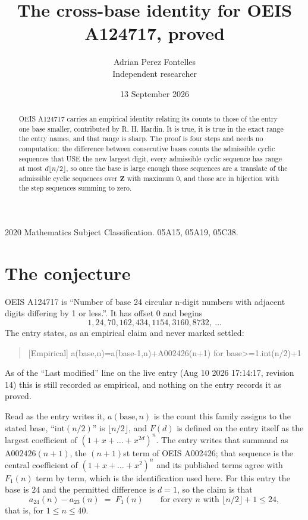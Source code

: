\documentclass[11pt,a4paper]{article}
\title{The cross-base identity for OEIS A124717, proved}
\author{Adrian Perez Fontelles\\ \small Independent researcher}
\date{13 September 2026}
\theoremstyle{plain}
\theoremstyle{definition}
\begin{document}
\maketitle

\begin{abstract}
OEIS A124717 carries an empirical identity relating its counts to those of the entry one base
smaller, contributed by R. H. Hardin. It is true, it is true in the exact range the entry
names, and that range is sharp. The proof is four steps and needs no computation: the
difference between consecutive bases counts the admissible cyclic sequences that USE the new
largest digit, every admissible cyclic sequence has range at most $d\lfloor n/2\rfloor$, so
once the base is large enough those sequences are a translate of the admissible cyclic
sequences over $\mathbf{Z}$ with maximum $0$, and those are in bijection with the step
sequences summing to zero.
\end{abstract}

\noindent\small 2020 Mathematics Subject Classification. 05A15, 05A19, 05C38.\normalsize

\section{The conjecture}

OEIS A124717 is ``Number of base 24 circular n-digit numbers with adjacent digits differing by 1 or less.''. It has offset $0$ and begins
\[
1, 24, 70, 162, 434, 1154, 3160, 8732,\ \dots
\]
The entry states, as an empirical claim and never marked settled:
\begin{quote}
[Empirical] a(base,n)=a(base-1,n)+A002426(n+1) for base>=1.int(n/2)+1
\end{quote}
As of the ``Last modified'' line on the live entry (Aug 10 2026 17:14:17, revision 14)
this is still recorded as empirical, and nothing on the entry records it as proved.

Read as the entry writes it, $a(\mathrm{base},n)$ is the count this family assigns to the
stated base, ``$\mathrm{int}(n/2)$'' is $\lfloor n/2\rfloor$, and $F(d)$ is defined on the
entry itself as the largest coefficient of $(1+x+\dots+x^{2d})^{n}$. The entry writes that summand as $\mathrm{A002426}(n+1)$, the $(n+1)$st term of OEIS A002426; that sequence is the central coefficient of $(1+x+\dots+x^{2})^{n}$ and its published terms agree with $F_{1}(n)$ term by term, which is the identification used here. For this entry
the base is $24$ and the permitted difference is $d=1$, so the claim is that
\[
a_{24}(n)-a_{23}(n)\;=\;F_{1}(n)
\qquad\text{for every } n \text{ with } \lfloor n/2\rfloor+1\le24,
\]
that is, for $1\le n\le40$.
\end{document}
